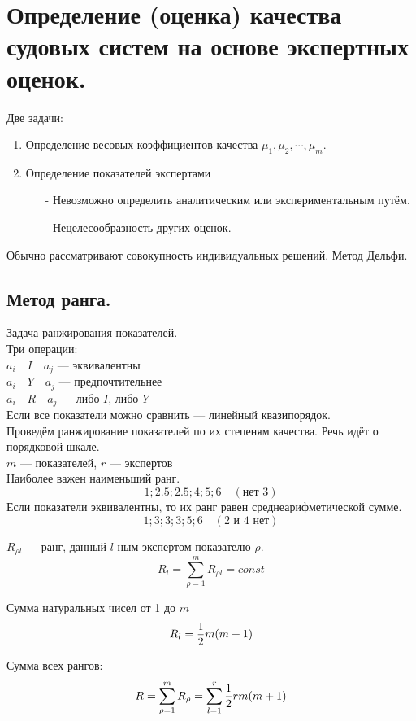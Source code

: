 \documentclass[12pt,a5paper]{scrbook}
\begin{document}
  \section{Определение (оценка) качества судовых систем на основе экспертных оценок.}
  Две задачи:
  \begin{enumerate}
    \item Определение весовых коэффициентов качества $\mu_1,\mu_2,\cdots,\mu_m$.
    \item Определение показателей экспертами
    \begin{itemize}
      \item[-] Невозможно определить аналитическим или экспериментальным путём.
      \item[-] Нецелесообразность других оценок.
    \end{itemize}
  \end{enumerate}
  Обычно рассматривают совокупность индивидуальных решений. Метод Дельфи.
  
  \subsection*{Метод ранга.}
  Задача ранжирования показателей.\\
  Три операции:\\
  $a_i \quad I \quad a_j$ --- эквивалентны\\
  $a_i \quad Y \quad a_j$ --- предпочтительнее\\
  $a_i \quad R \quad a_j$ --- либо $I$, либо $Y$\\
  
  Если все показатели можно сравнить --- линейный квазипорядок.\\
  
  Проведём ранжирование показателей по их степеням качества. Речь идёт о порядковой шкале.\\
  $m$ --- показателей, $r$ --- экспертов\\
  Наиболее важен наименьший ранг.
  $$1;2.5;2.5;4;5;6\quad (\text{нет 3})$$
  Если показатели эквивалентны, то их ранг равен среднеарифметической сумме.
  $$1;3;3;3;5;6\quad (\text{2 и 4 нет})$$
  
  $R_{\rho l}$ --- ранг, данный $l$-ным экспертом показателю $\rho$.
  $$R_l=\sum_{\rho=1}^m R_{\rho l} = const$$
  
  Сумма натуральных чисел от 1 до $m$
  $$R_l={1 \over 2} m (m+1)$$
  
  Сумма всех рангов:
  $$R=\sum_{\rho=1}^m R_{\rho} = \sum_{l=1}^r {1 \over 2} rm (m+1)$$
  
\end{document}

